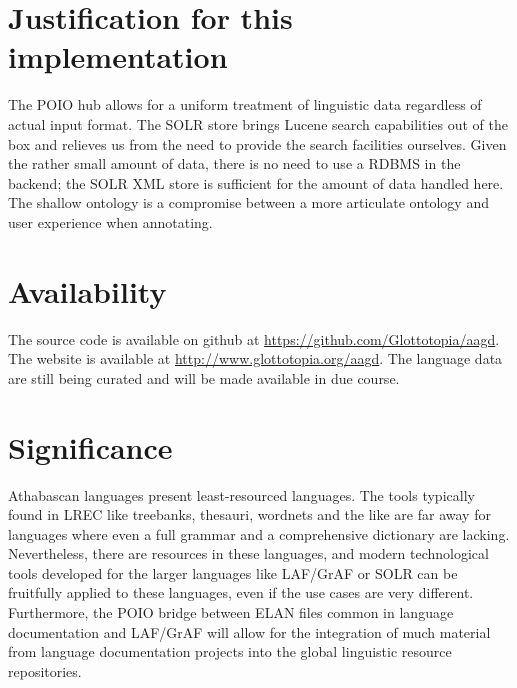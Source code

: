\documentclass[10pt, a4paper]{article}
\begin{document}
   
\section{Justification for this implementation}  
The POIO hub allows for a uniform treatment of linguistic data regardless of actual input format. The SOLR store brings Lucene search capabilities out of the box and relieves us from the need to provide the search facilities ourselves. Given the rather small amount of data, there is no need to use a RDBMS in the backend; the SOLR XML store is sufficient for the amount of data handled here. The shallow ontology is a compromise between a more articulate ontology and user experience when annotating. 

\section{Availability}
The source code is available on github at {\small\url{https://github.com/Glottotopia/aagd}}.
The website is available at {\small\url{http://www.glottotopia.org/aagd}}.
The language data are still being curated and will be made available in due course. 
 
\section{Significance}
Athabascan languages present least-resourced languages. The tools typically found in LREC like treebanks, thesauri, wordnets and the like are far away for languages where even a full grammar and a comprehensive dictionary are lacking. Nevertheless, there are resources in these languages, and modern technological tools developed for the larger languages like LAF/GrAF or SOLR can be fruitfully applied to these languages, even if the use cases are very different. Furthermore, the POIO bridge between ELAN files common in language documentation and LAF/GrAF will allow for the integration of much material from language documentation projects into the global linguistic resource repositories. 
\onecolumn
\end{document}
